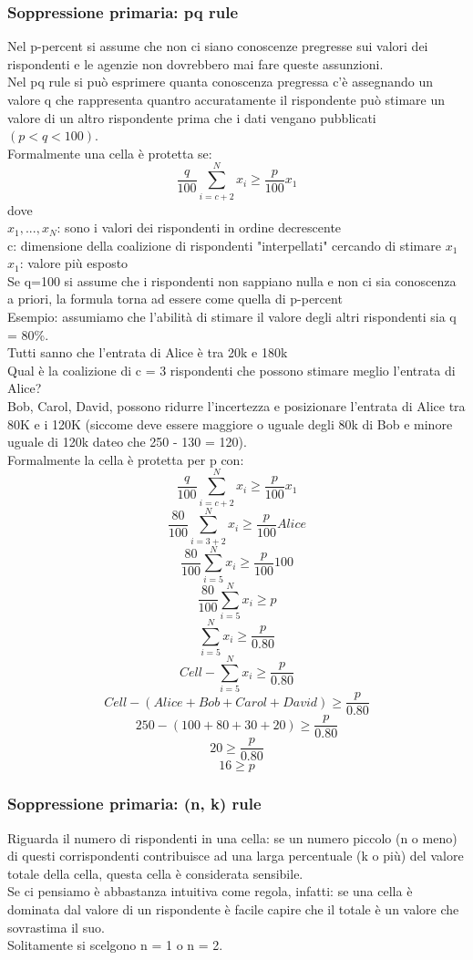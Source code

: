 \subsubsection{Soppressione primaria: pq rule}
Nel p-percent si assume che non ci siano conoscenze pregresse sui valori dei rispondenti e le agenzie non dovrebbero mai fare queste assunzioni.\\
Nel pq rule si può esprimere quanta conoscenza pregressa c'è assegnando un valore q che rappresenta quantro accuratamente il rispondente può stimare un valore di un altro rispondente prima che i dati vengano pubblicati \(( p < q < 100)\).\\
Formalmente una cella è protetta se: 
\[\frac{q}{100} \sum_{i=c+2}^N x_i \geq \frac{p}{100}x_1\]
dove\\ 
\(x_1,...,x_N\): sono i valori dei rispondenti in ordine decrescente \\
c: dimensione della coalizione di rispondenti "interpellati" cercando di stimare \(x_1\) \\
\(x_1\): valore più esposto \\
Se q=100 si assume che i rispondenti non sappiano nulla e non ci sia conoscenza a priori, la formula torna ad essere come quella di p-percent\\
Esempio: assumiamo che l'abilità di stimare il valore degli altri rispondenti sia q = 80\%.\\
Tutti sanno che l'entrata di Alice è tra 20k e 180k\\
Qual è la coalizione di c = 3 rispondenti che possono stimare meglio l'entrata di Alice?\\
Bob, Carol, David, possono ridurre l'incertezza e posizionare l'entrata di Alice tra 80K e i 120K (siccome deve essere maggiore o uguale degli 80k di Bob e minore uguale di 120k dateo che 250 - 130 = 120).\\
Formalmente la cella è protetta per p con:
\[\frac{q}{100} \sum_{i=c+2}^N x_i \geq \frac{p}{100}x_1\]
\[\frac{80}{100} \sum_{i=3+2}^N x_i \geq \frac{p}{100}Alice\]
\[\frac{80}{100} \sum_{i=5}^N x_i \geq \frac{p}{100}100\]
\[\frac{80}{100} \sum_{i=5}^N x_i \geq p\]
\[\sum_{i=5}^N x_i \geq \frac{p}{0.80}\]
\[Cell - \sum_{i=5}^N x_i \geq \frac{p}{0.80}\]
\[Cell - (Alice + Bob + Carol + David) \geq \frac{p}{0.80} \]
\[250 - (100 + 80 + 30 + 20) \geq \frac{p}{0.80} \]
\[20 \geq \frac{p}{0.80} \]
\[16 \geq p \]

\subsubsection{Soppressione primaria: (n, k) rule}
Riguarda il numero di rispondenti in una cella: se un numero piccolo (n o meno) di questi corrispondenti contribuisce ad una larga percentuale (k o più) del valore totale della cella, questa cella è considerata sensibile.\\
Se ci pensiamo è abbastanza intuitiva come regola, infatti: se una cella è dominata dal valore di un rispondente è facile capire che il totale è un valore che sovrastima il suo.\\
Solitamente si scelgono n = 1 o n = 2.\\

